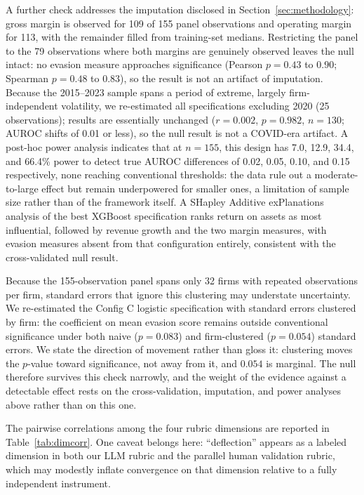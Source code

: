 \documentclass[conference]{IEEEtran}
\begin{document}
A further check addresses the imputation disclosed in Section~\ref{sec:methodology}: gross margin is observed for 109 of 155 panel observations and operating margin for 113, with the remainder filled from training-set medians. Restricting the panel to the 79 observations where both margins are genuinely observed leaves the null intact: no evasion measure approaches significance (Pearson $p = 0.43$ to $0.90$; Spearman $p = 0.48$ to $0.83$), so the result is not an artifact of imputation. Because the 2015--2023 sample spans a period of extreme, largely firm-independent volatility, we re-estimated all specifications excluding 2020 (25 observations); results are essentially unchanged ($r = 0.002$, $p = 0.982$, $n = 130$; AUROC shifts of 0.01 or less), so the null result is not a COVID-era artifact. A post-hoc power analysis indicates that at $n = 155$, this design has 7.0, 12.9, 34.4, and 66.4\% power to detect true AUROC differences of 0.02, 0.05, 0.10, and 0.15 respectively, none reaching conventional thresholds: the data rule out a moderate-to-large effect but remain underpowered for smaller ones, a limitation of sample size rather than of the framework itself. A SHapley Additive exPlanations analysis of the best XGBoost specification ranks return on assets as most influential, followed by revenue growth and the two margin measures, with evasion measures absent from that configuration entirely, consistent with the cross-validated null result.


Because the 155-observation panel spans only 32 firms with repeated observations per firm, standard errors that ignore this clustering may understate uncertainty. We re-estimated the Config C logistic specification with standard errors clustered by firm: the coefficient on mean evasion score remains outside conventional significance under both naive ($p = 0.083$) and firm-clustered ($p = 0.054$) standard errors. We state the direction of movement rather than gloss it: clustering moves the $p$-value toward significance, not away from it, and $0.054$ is marginal. The null therefore survives this check narrowly, and the weight of the evidence against a detectable effect rests on the cross-validation, imputation, and power analyses above rather than on this one.

The pairwise correlations among the four rubric dimensions are reported in Table~\ref{tab:dimcorr}. One caveat belongs here: ``deflection'' appears as a labeled dimension in both our LLM rubric and the parallel human validation rubric, which may modestly inflate convergence on that dimension relative to a fully independent instrument.
\end{document}
